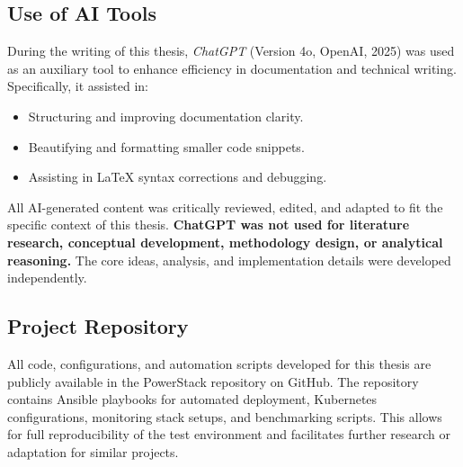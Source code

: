 \subsection{Use of AI Tools}
During the writing of this thesis, \textit{ChatGPT}\parencite{OpenAI_ChatGPT_2025} (Version 4o, OpenAI, 2025) was used as an auxiliary tool to enhance efficiency in documentation and technical writing. Specifically, it assisted in:
\begin{itemize}
\item Structuring and improving documentation clarity.
\item Beautifying and formatting smaller code snippets.
\item Assisting in LaTeX syntax corrections and debugging.
\end{itemize}
All AI-generated content was critically reviewed, edited, and adapted to fit the specific context of this thesis. \textbf{ChatGPT was not used for literature research, conceptual development, methodology design, or analytical reasoning.} The core ideas, analysis, and implementation details were developed independently.

\subsection {Project Repository}
All code, configurations, and automation scripts developed for this thesis are publicly available in the PowerStack\parencite{PowerStack} repository on GitHub. The repository contains Ansible playbooks for automated deployment, Kubernetes configurations, monitoring stack setups, and benchmarking scripts. This allows for full reproducibility of the test environment and facilitates further research or adaptation for similar projects.